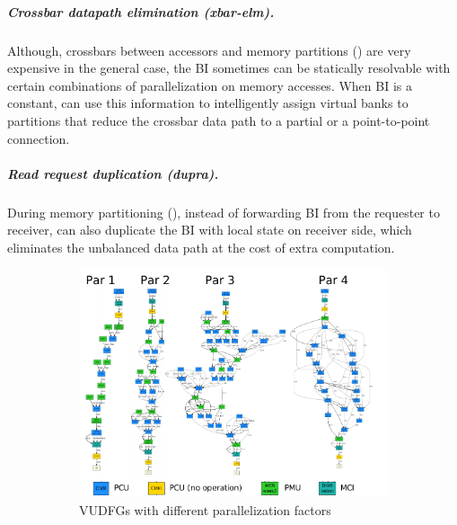 \subparagraph{Crossbar datapath elimination (xbar-elm).}
Although, crossbars between accessors and memory partitions () are very expensive in the general case, the BI sometimes can be statically resolvable with certain combinations of parallelization on memory accesses. 
When BI is a constant, \name{} can use this information to intelligently assign virtual banks to partitions that reduce the crossbar data path to a partial or a point-to-point connection.

\subparagraph{Read request duplication (dupra).} During memory partitioning (), instead of forwarding BI from the requester to receiver, \name{} can also duplicate the BI with local state on receiver side, which
eliminates the unbalanced data path at the cost of extra computation.

\begin{figure}
\centering
\begin{subfigure}[b]{0.6\textwidth}
\includegraphics[width=1\textwidth]{figs/mlpunroll.pdf}
\caption{VUDFGs with different parallelization factors}
\end{subfigure}
\hfill
\begin{subfigure}[b]{0.39\textwidth}

\end{subfigure}
\end{figure}

